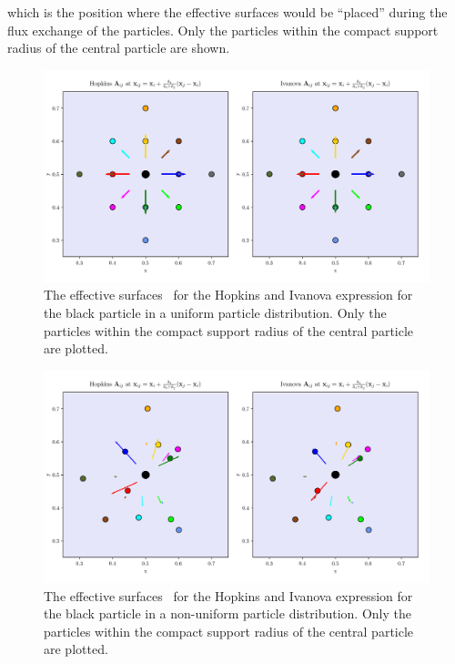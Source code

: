 which is the position where the effective surfaces would be ``placed'' during the flux exchange of
the particles. Only the particles within the compact support radius of the central particle are
shown.

\begin{figure}[htpb]
\centering
\includegraphics[width=\textwidth]{figures/Meshless/effective-area-hopkins-vs-ivanova.png}
\caption{\label{fig:uniform-arrows}
    The effective surfaces \Aij\ for the Hopkins and Ivanova expression for the black particle in a
    uniform particle distribution.  Only the particles within the compact support radius of the
    central particle are plotted.
}
\end{figure}



\begin{figure}[htpb]
\centering
\includegraphics[width=\textwidth]{
figures/Meshless/effective-area-hopkins-vs-ivanova-perturbed.png}
\caption{\label{fig:perturbed-arrows}
    The effective surfaces \Aij\ for the Hopkins and Ivanova expression for the black particle
    in a non-uniform particle distribution. Only the particles within the compact support radius of
    the central particle are plotted.
}
\end{figure}

